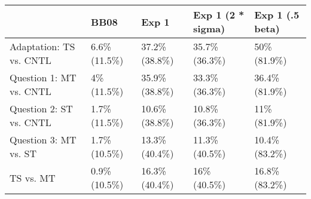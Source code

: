 
\begin{tabular}{l|l|l|l|l}
\hline
  & BB08 & Exp 1 & Exp 1 (2 * sigma) & Exp 1 (.5 beta)\\
\hline
Adaptation: TS vs. CNTL & 6.6\% (11.5\%) & 37.2\% (38.8\%) & 35.7\% (36.3\%) & 50\% (81.9\%)\\
\hline
Question 1: MT vs. CNTL & 4\% (11.5\%) & 35.9\% (38.8\%) & 33.3\% (36.3\%) & 36.4\% (81.9\%)\\
\hline
Question 2: ST vs. CNTL & 1.7\% (11.5\%) & 10.6\% (38.8\%) & 10.8\% (36.3\%) & 11\% (81.9\%)\\
\hline
Question 3: MT vs. ST & 1.7\% (10.5\%) & 13.3\% (40.4\%) & 11.3\% (40.5\%) & 10.4\% (83.2\%)\\
\hline
TS vs. MT & 0.9\% (10.5\%) & 16.3\% (40.4\%) & 16\% (40.5\%) & 16.8\% (83.2\%)\\
\hline
\end{tabular}
